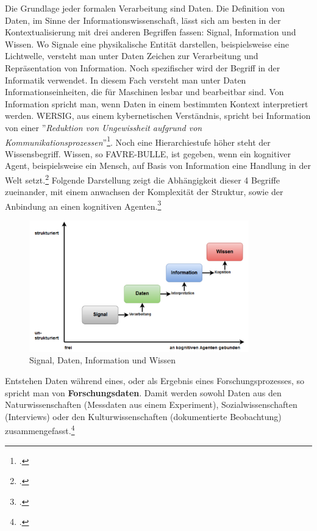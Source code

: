 \documentclass[12pt,a4paper]{article}
\begin{document}
Die Grundlage jeder formalen Verarbeitung sind Daten. Die Definition von Daten, im Sinne der Informationswissenschaft, lässt sich am besten in der Kontextualisierung mit drei anderen Begriffen fassen: Signal, Information und Wissen. Wo Signale eine physikalische Entität darstellen, beispielsweise eine Lichtwelle, versteht man unter Daten Zeichen zur Verarbeitung und Repräsentation von Information. Noch spezifischer wird der Begriff in der Informatik verwendet. In diesem Fach versteht man unter Daten Informationseinheiten, die für Maschinen lesbar und bearbeitbar sind. Von Information spricht man, wenn Daten in einem bestimmten Kontext interpretiert werden. WERSIG, aus einem kybernetischen Verständnis, spricht bei Information von einer ''\textit{Reduktion von Ungewissheit aufgrund von Kommunikationsprozessen}''\footcite[][S.74]{wersig1971information}. Noch eine Hierarchiestufe höher steht der Wissensbegriff. Wissen, so FAVRE-BULLE, ist gegeben, wenn ein kognitiver Agent, beispielsweise ein Mensch, auf Basis von Information eine Handlung in der Welt setzt.\footcite[][S.93-97]{favre2001information} Folgende Darstellung zeigt die Abhängigkeit dieser 4 Begriffe zueinander, mit einem anwachsen der Komplexität der Struktur, sowie der Anbindung an einen kognitiven Agenten.\footcite[Eine ausführlichere Auseinandersetzung mit den Begriffen Daten, Information und Wissen findet sich in meiner ersten Abschlussarbeit.][Masterarbeit Graz, S.20-28]{pollin2017suchen}
\begin{figure}[H]
\centering
	\includegraphics[width=0.85\textwidth]{img/daten.png}  
    \caption[Signal, Daten, Information und Wissen. POLLIN Christopher: Vom Suchen, Stöbern und Finden : Information Retrieval am Beispiel der Digitalen Sammlung des Hans Gross Kriminalmuseums, Masterarbeit Graz, S.21 ]{Signal, Daten, Information und Wissen} \label{fig:daten}
\end{figure} 
Entstehen Daten während eines, oder als Ergebnis eines Forschungsprozesses, so spricht man von \textbf{Forschungsdaten}. Damit werden sowohl Daten aus den Naturwissenschaften (Messdaten aus einem Experiment), Sozialwissenschaften (Interviews) oder den Kulturwissenschaften (dokumentierte Beobachtung) zusammengefasst.\footcite[][09.06.2019]{kindling2013forschungsdatenmanagement}
\end{document}
